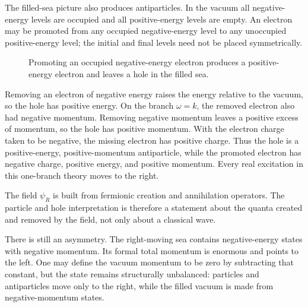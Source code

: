 The filled-sea picture also produces antiparticles. In the vacuum all negative-energy levels are occupied and all positive-energy levels are empty. An electron may be promoted from any occupied negative-energy level to any unoccupied positive-energy level; the initial and final levels need not be placed symmetrically.

\begin{figure}[htbp]
\centering
{}
\caption{Promoting an occupied negative-energy electron produces a positive-energy electron and leaves a hole in the filled sea.}
\end{figure}

Removing an electron of negative energy raises the energy relative to the vacuum, so the hole has positive energy. On the branch \(\omega=k\), the removed electron also had negative momentum. Removing negative momentum leaves a positive excess of momentum, so the hole has positive momentum. With the electron charge taken to be negative, the missing electron has positive charge. Thus the hole is a positive-energy, positive-momentum antiparticle, while the promoted electron has negative charge, positive energy, and positive momentum. Every real excitation in this one-branch theory moves to the right.

The field \(\psi_R\) is built from fermionic creation and annihilation operators. The particle and hole interpretation is therefore a statement about the quanta created and removed by the field, not only about a classical wave.

There is still an asymmetry. The right-moving sea contains negative-energy states with negative momentum. Its formal total momentum is enormous and points to the left. One may define the vacuum momentum to be zero by subtracting that constant, but the state remains structurally unbalanced: particles and antiparticles move only to the right, while the filled vacuum is made from negative-momentum states.

